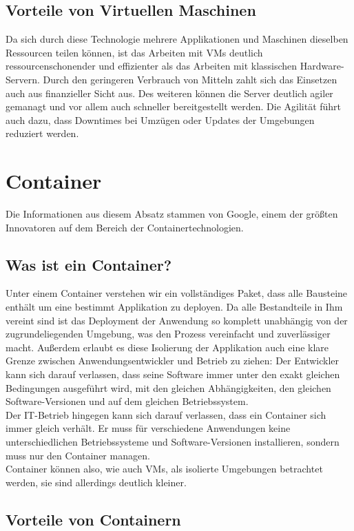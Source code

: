 \subsection{Vorteile von Virtuellen Maschinen}
Da sich durch diese Technologie mehrere Applikationen und Maschinen dieselben Ressourcen teilen können, ist das Arbeiten mit \ac{VM}s deutlich ressourcenschonender und effizienter als das Arbeiten mit klassischen Hardware-Servern.
Durch den geringeren Verbrauch von Mitteln zahlt sich das Einsetzen auch aus finanzieller Sicht aus.
Des weiteren können die Server deutlich agiler gemanagt und vor allem auch schneller bereitgestellt werden.
Die Agilität führt auch dazu, dass Downtimes bei Umzügen oder Updates der Umgebungen reduziert werden.



\section{Container}
Die Informationen aus diesem Absatz stammen von Google\cite{containers}, einem der größten Innovatoren auf dem Bereich der Containertechnologien.
\subsection{Was ist ein Container?}
Unter einem Container verstehen wir ein vollständiges Paket, dass alle Bausteine enthält um eine bestimmt Applikation zu deployen.
Da alle Bestandteile in Ihm vereint sind ist das Deployment der Anwendung so komplett unabhängig von der zugrundeliegenden Umgebung, was den Prozess vereinfacht und zuverlässiger macht.
Außerdem erlaubt es diese Isolierung der Applikation auch eine klare Grenze zwischen Anwendungsentwickler und Betrieb zu ziehen:
Der Entwickler kann sich darauf verlassen, dass seine Software immer unter den exakt gleichen Bedingungen ausgeführt wird, mit den gleichen Abhängigkeiten, den gleichen Software-Versionen und auf dem gleichen Betriebssystem.
\\
Der IT-Betrieb hingegen kann sich darauf verlassen, dass ein Container sich immer gleich verhält. 
Er muss für verschiedene Anwendungen keine unterschiedlichen Betriebssysteme und Software-Versionen installieren, sondern muss nur den Container managen.
\\
Container können also, wie auch \ac{VM}s, als isolierte Umgebungen betrachtet werden, sie sind allerdings deutlich kleiner.

\subsection{Vorteile von Containern}

